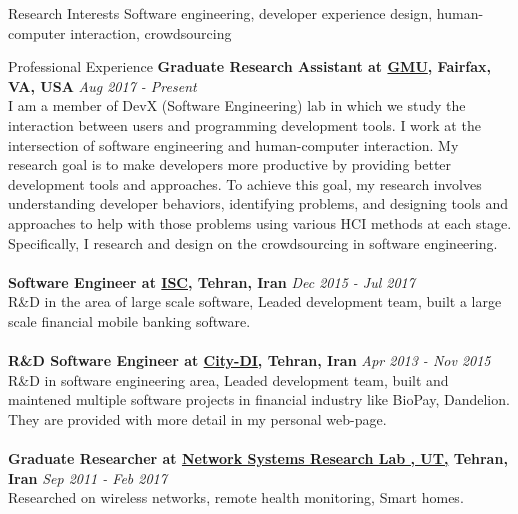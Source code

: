 \documentclass{resume} %
\begin{document}
\begin{rSection}{Research Interests}
Software	engineering,	developer	experience	design,	human-computer	interaction,	crowdsourcing


\end{rSection}


\begin{rSection}{Professional Experience}
{\bf Graduate Research Assistant at \href{https://www2.gmu.edu} {GMU}, Fairfax, VA, USA} \hfill {\em Aug 2017 - Present} 
\\ I am a member of DevX (Software Engineering) lab in which we study the interaction
between users and programming development tools. I work at the intersection of software engineering and human-computer interaction.  My research goal is to make developers more productive by providing better development tools and approaches. To achieve this goal, my research involves understanding developer behaviors, identifying problems, and designing tools and approaches to help with those problems using various HCI methods at each stage. Specifically, I research and design on the crowdsourcing in software engineering.\\
\\{\bf Software Engineer at \href{https://en.isc.co.ir/Portal/Home/}{ISC}, Tehran, Iran} \hfill {\em Dec 2015 - Jul 2017} 
\\ R\&D in the area of large scale software, Leaded development team, built a large scale financial mobile banking software. \\
\\{\bf R\&D Software Engineer at \href{https://www.citydi.com/}{City-DI}, Tehran, Iran} \hfill {\em Apr 2013 - Nov 2015} 
\\ R\&D in software engineering area, Leaded development team, built and maintened multiple software projects in financial industry like BioPay, Dandelion. They are provided with more detail in my personal web-page. \\
\\{\bf Graduate Researcher at \href{https://ut.ac.ir/en} {Network Systems Research Lab , UT,} Tehran, Iran} \hfill {\em Sep 2011 - Feb 2017} 
\\ Researched on wireless networks, remote health monitoring, Smart homes. \\


\end{rSection}
\end{document}
